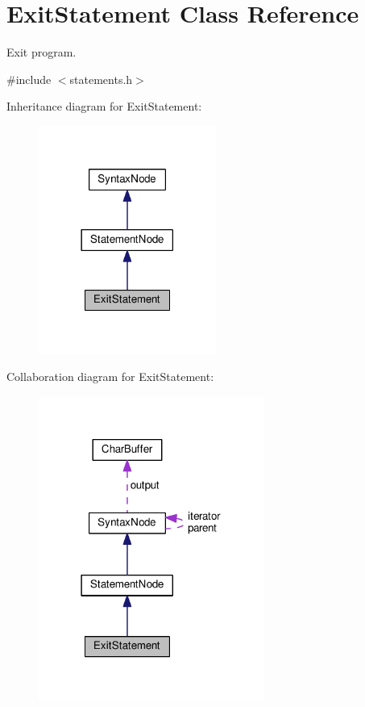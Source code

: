 \hypertarget{classExitStatement}{}\section{Exit\+Statement Class Reference}
\label{classExitStatement}


Exit program.  




{\ttfamily \#include $<$statements.\+h$>$}



Inheritance diagram for Exit\+Statement\+:\nopagebreak
\begin{figure}[H]
\begin{center}
\leavevmode
\includegraphics[width=165pt]{classExitStatement__inherit__graph}
\end{center}
\end{figure}


Collaboration diagram for Exit\+Statement\+:\nopagebreak
\begin{figure}[H]
\begin{center}
\leavevmode
\includegraphics[width=210pt]{classExitStatement__coll__graph}
\end{center}
\end{figure}
